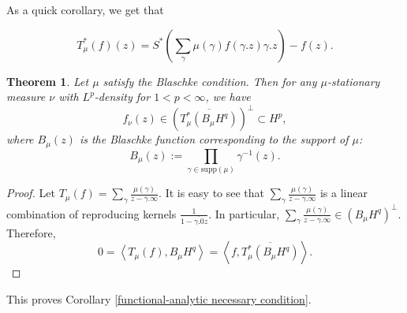 \documentclass[11pt]{article}
\newtheorem{theorem}{Theorem}[section]
\begin{document}
As a quick corollary, we get that

\begin{equation}
	\label{adjoint of LHS}
	T_\mu^*(f)(z) = S^*\left( \sum_{\gamma} \mu(\gamma) f(\gamma.z) \gamma.z\right)  - f(z).
\end{equation}

\begin{theorem}
	Let $\mu$ satisfy the Blaschke condition. Then for any $\mu$-stationary measure $\nu$ with $L^p$-density for $1 < p < \infty$, we have
	\[
	f_\nu(z) \in (\overline{T_\mu^*(B_\mu H^q)})^{\perp} \subset H^p,
	\]
	where $B_\mu(z)$ is the Blaschke function corresponding to the support of $\mu$:
	\[
	B_\mu(z) := \prod_{\gamma \in \text{supp}(\mu)} \gamma^{-1}(z).
	\]
\end{theorem}

\begin{proof}
	Let $T_\mu(f) = \sum_{\gamma} \frac{\mu(\gamma)}{z - \gamma.\infty}$. It is easy to see that $\sum_{\gamma} \frac{\mu(\gamma)}{z - \gamma.\infty}$ is a linear combination of reproducing kernels $\frac{1}{1 - \overline{\gamma.0}z}$. In particular, $\sum_{\gamma} \frac{\mu(\gamma)}{z - \gamma.\infty} \in (B_\mu H^q)^\perp$. Therefore,
	\[
	0 = \left\langle T_\mu(f), B_\mu H^q \right\rangle = \left\langle f, \overline{T_\mu^*(B_\mu H^q)} \right\rangle.
	\]
\end{proof}

This proves Corollary \ref{functional-analytic necessary condition}. 
\end{document}
